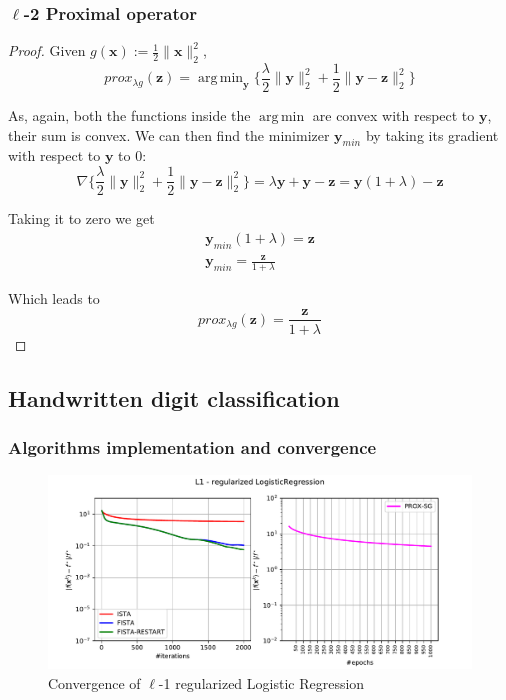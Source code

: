 \documentclass[12pt]{article}
\DeclareMathOperator*{\argmin}{arg\,min}
\begin{document}
\subsubsection{\texorpdfstring{$\ell$}{Lg}-2 Proximal operator}
\begin{proof}
Given $g(\mathbf{x}) := \frac{1}{2} \lVert \mathbf{x} \rVert_{2}^{2}$,
\begin{equation}
    prox_{\lambda g}(\mathbf{z}) = \argmin_{\mathbf{y}} \{\frac{\lambda}{2} \lVert \mathbf{y} \rVert_2^2 + \frac{1}{2} \lVert \mathbf{y} - \mathbf{z} \rVert_2^2 \}
\end{equation}

As, again, both the functions inside the $\argmin$ are convex with respect to $\mathbf{y}$, their sum is convex. We can then find the minimizer $\mathbf{y}_{min}$ by taking its gradient with respect to $\mathbf{y}$ to 0:
\begin{equation}
    \nabla \{\frac{\lambda}{2} \lVert \mathbf{y} \rVert_2^2 + \frac{1}{2} \lVert \mathbf{y} - \mathbf{z} \rVert_2^2 \} = \lambda \mathbf{y} + \mathbf{y} - \mathbf{z} = \mathbf{y}(1 + \lambda) - \mathbf{z}
\end{equation}

Taking it to zero we get
\begin{gather}
    \mathbf{y}_{min}(1 + \lambda) = \mathbf{z} \\
    \mathbf{y}_{min} = \frac{\mathbf{z}}{1 + \lambda}
\end{gather}

Which leads to
\begin{equation}
    prox_{\lambda g}(\mathbf{z}) = \frac{\mathbf{z}}{1 + \lambda}
\end{equation}
\end{proof}

\subsection{Handwritten digit classification}

\subsubsection{Algorithms implementation and convergence}

\begin{figure}
    \centering
    \includegraphics[width=17cm]{hw3/codes/exercise1/results/l1.pdf}
    \caption{Convergence of $\ell$-1 regularized Logistic Regression}
    \label{fig:l1-convergence}
\end{figure}
\end{document}
